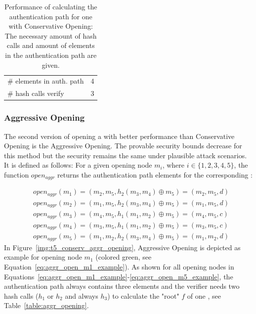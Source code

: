 \begin{table}
\centering
\begin{tabular}{l c} 
 \hline\noalign{\smallskip}
 \multicolumn{2}{c}{\textbf{Conservative Opening}} \\
 \hline\noalign{\smallskip}
 \# elements in auth. path & 4 \\
  \# hash calls verify & 3 \\
 \hline
\end{tabular}
\caption{Performance of calculating the authentication path for one \tfblock with Conservative Opening: The necessary amount of hash calls and amount of elements in the authentication path are given.}
\label{table:conserv_opening}
\end{table}

\subsubsection{Aggressive Opening}
\label{sec:aggr_opening}
The second version of opening a \tfblock with better performance than Conservative Opening is the Aggressive Opening. The provable security bounds decrease for this method but the security remains the same under plausible attack scenarios. It is defined as follows: For a given opening node $m_i$, where $i \in \{1,2,3,4,5\}$, the function $open_{aggr}$ returns the authentication path elements for the corresponding \tfblock:

\begin{align}
&open_{aggr}(m_1) = (m_2, m_5, h_2(m_3,m_4) \oplus m_5) = (m_2, m_5, d) \label{eq:aggr_open_m1_example} \\
&open_{aggr}(m_2) = (m_1, m_5, h_2(m_3,m_4) \oplus m_5) = (m_1, m_5, d) \\
&open_{aggr}(m_3) = (m_4, m_5, h_1(m_1, m_2) \oplus m_5) = (m_4, m_5, c) \\ 
&open_{aggr}(m_4) = (m_3, m_5, h_1(m_1, m_2) \oplus m_5) = (m_3, m_5, c) \\ 
&open_{aggr}(m_5) = (m_1, m_2, h_2(m_3, m_4) \oplus m_5) = (m_1, m_2, d) \label{eq:aggr_open_m5_example}
\end{align}
In Figure~\ref{img:t5_conserv_aggr_opening}, Aggressive Opening is depicted as example for opening node $m_1$ (colored green, see Equation~\ref{eq:aggr_open_m1_example}). 
As shown for all opening nodes in Equations~\ref{eq:aggr_open_m1_example}-\ref{eq:aggr_open_m5_example}, the authentication path always contains three elements and the verifier needs two hash calls ($h_1$ or $h_2$ and always $h_3$) to calculate the "root" $f$ of one \tfblock, see Table~\ref{table:aggr_opening}.

